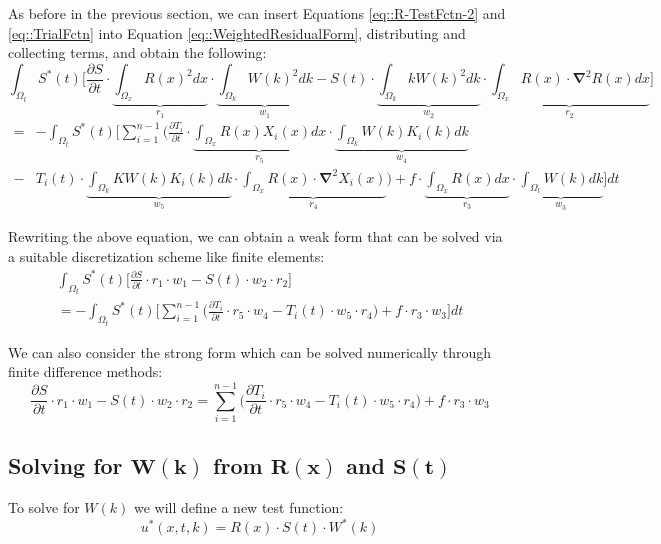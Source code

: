 \documentclass{article}
\def\ds{\displaystyle}
\def\pd{\partial}
\def\grad{\mathbf\nabla}
\begin{document}
As before in the previous section, we can insert Equations \ref{eq::R-TestFctn-2} and \ref{eq::TrialFctn} into Equation \ref{eq::WeightedResidualForm}, distributing and collecting terms, and obtain the following:
\begin{equation*}
\ds\int_{\Omega_t} S^*(t) \bigg[ \frac{\pd S}{\pd t} \cdot \underbrace{\ds\int_{\Omega_x} R(x)^2 dx}_{r_1} \cdot \underbrace{\ds\int_{\Omega_k}W(k)^2 dk}_{w_1} - S(t) \cdot \underbrace{\ds\int_{\Omega_k}kW(k)^2dk}_{w_2} \cdot \underbrace{\int_{\Omega_x} R(x)\cdot\grad^2R(x) dx}_{r_2} \bigg]
\end{equation*}\vspace{-15pt}
\begin{align}
= & - \ds\int_{\Omega_t} S^*(t) \Bigg[ \ds\sum_{i=1}^{n-1} \bigg( \frac{\pd T_i}{\pd t} \cdot  \underbrace{\ds\int_{\Omega_x} R(x) X_i(x) dx}_{r_5} \cdot \underbrace{\ds\int_{\Omega_k}W(k)K_i(k) dk}_{w_4} \nonumber\\
 - & T_i(t)\cdot \underbrace{\ds\int_{\Omega_k} KW(k)K_i(k)dk}_{w_5} \cdot \underbrace{\ds\int_{\Omega_x} R(x)\cdot\grad^2X_i(x)}_{r_4} \bigg) + f \cdot \underbrace{\ds\int_{\Omega_x} R(x)dx}_{r_3} \cdot \underbrace{\ds\int_{\Omega_t} W(k)dk}_{w_3} \Bigg] dt
\end{align}

Rewriting the above equation, we can obtain a weak form that can be solved via a suitable discretization scheme like finite elements:
\begin{gather}
\ds\int_{\Omega_t} S^*(t) \bigg[ \frac{\pd S}{\pd t} \cdot r_1 \cdot w_1- S(t) \cdot w_2 \cdot r_2 \bigg] \nonumber \\
= - \ds\int_{\Omega_t} S^*(t) \Bigg[ \ds\sum_{i=1}^{n-1} \bigg( \frac{\pd T_i}{\pd t} \cdot r_5 \cdot w_4 - T_i(t)\cdot w_5 \cdot r_4 \bigg) + f \cdot r_3 \cdot w_3 \Bigg] dt
\end{gather}

We can also consider the strong form which can be solved numerically through finite difference methods:
\begin{equation}
\label{eq::S-Strong}
\frac{\pd S}{\pd t} \cdot r_1 \cdot w_1 - S(t) \cdot w_2 \cdot r_2 = \ds\sum_{i=1}^{n-1} \bigg( \frac{\pd T_i}{\pd t} \cdot r_5 \cdot w_4 - T_i(t)\cdot w_5 \cdot r_4 \bigg) + f \cdot r_3 \cdot w_3
\end{equation}

\subsection{Solving for $\mathbf{W(k)}$ from $\mathbf{R(x)}$ and $\mathbf{S(t)}$}
To solve for $W(k)$ we will define a new test function:
\begin{equation}
\label{eq::R-TestFctn-3}
u^*(x,t,k) = R(x) \cdot S(t) \cdot W^*(k)
\end{equation}
\end{document}
